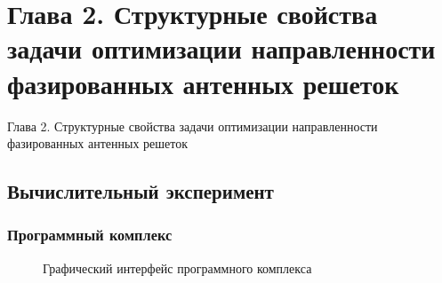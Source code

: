 \section{Глава 2. Структурные свойства задачи оптимизации направленности фазированных антенных решеток}
\begin{frame}
    \begin{center}
        \Huge
        Глава 2. Структурные свойства задачи оптимизации направленности фазированных антенных решеток
    \end{center}
\end{frame}


\subsection{Вычислительный эксперимент}

\begin{frame}
    \frametitle{ Программный комплекс}

    \begin{figure}
    \centering
        \begin{minipage}[h]{1\linewidth}
        \end{minipage}
        \vspace{0.7em}
        \caption{Графический интерфейс программного комплекса}
        \label{ris:expi}
    \end{figure}

\end{frame}

